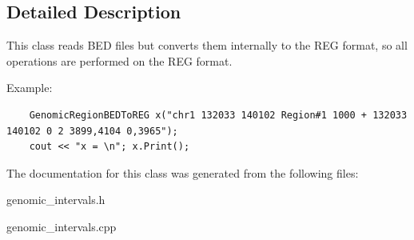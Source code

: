 \subsection{Detailed Description}
This class reads BED files but converts them internally to the REG format, so all operations are performed on the REG format. 

Example: 

\begin{Code}\begin{verbatim}    GenomicRegionBEDToREG x("chr1 132033 140102 Region#1 1000 + 132033 140102 0 2 3899,4104 0,3965");
    cout << "x = \n"; x.Print();
\end{verbatim}
\end{Code}

 

The documentation for this class was generated from the following files:\begin{CompactItemize}
\item 
genomic\_\-intervals.h\item 
genomic\_\-intervals.cpp\end{CompactItemize}
